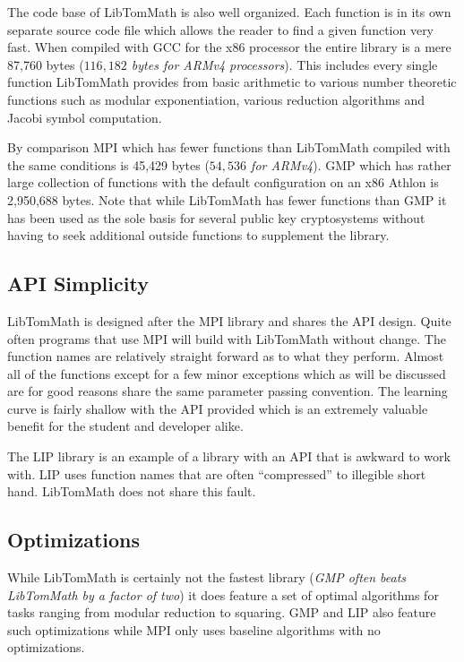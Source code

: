 \documentclass[b5paper]{book}
\begin{document}
The code base of LibTomMath is also well organized.  Each function is in its own separate source code file 
which allows the reader to find a given function very fast.  When compiled with GCC for the x86 processor the entire 
library is a mere 87,760 bytes (\textit{$116,182$ bytes for ARMv4 processors}).  This includes every single function 
LibTomMath provides from basic arithmetic to various number theoretic functions such as modular exponentiation, various 
reduction algorithms and Jacobi symbol computation.  

By comparison MPI which has fewer functions than LibTomMath compiled with the same conditions is 45,429 bytes 
(\textit{$54,536$ for ARMv4}).  GMP which has rather large collection of functions with the default configuration on an 
x86 Athlon is 2,950,688 bytes.  Note that while LibTomMath has fewer functions than GMP it has been used as the sole basis 
for several public key cryptosystems without having to seek additional outside functions to supplement the library.

\subsection{API Simplicity}
LibTomMath is designed after the MPI library and shares the API design.  Quite often programs that use MPI will build 
with LibTomMath without change. The function names are relatively straight forward as to what they perform.  Almost all of the 
functions except for a few minor exceptions which as will be discussed are for good reasons share the same parameter passing 
convention.  The learning curve is fairly shallow with the API provided which is an extremely valuable benefit for the 
student and developer alike.  

The LIP library is an example of a library with an API that is awkward to work with.  LIP uses function names that are often ``compressed'' to 
illegible short hand.  LibTomMath does not share this fault.

\subsection{Optimizations}
While LibTomMath is certainly not the fastest library (\textit{GMP often beats LibTomMath by a factor of two}) it does
feature a set of optimal algorithms for tasks ranging from modular reduction to squaring.  GMP and LIP also feature
such optimizations while MPI only uses baseline algorithms with no optimizations.
\end{document}
